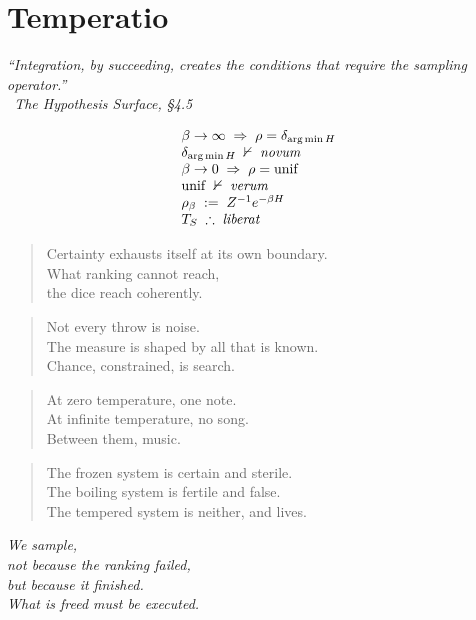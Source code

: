 \chapter*{Temperatio}
\label{sec:bk6_temperatio}
\begin{flushright}
\emph{``Integration, by succeeding, creates the conditions that require the sampling operator.''}\\
\emph{\textendash\ The Hypothesis Surface, \S 4.5}
\end{flushright}
\vspace{1em}
\begin{center}
\Large
\renewcommand{\arraystretch}{1.35}
\[
\begin{array}{l}
\beta \to \infty \;\Rightarrow\; \rho = \delta_{\arg\min H} \\
\delta_{\arg\min H} \;\nvdash\; \textit{novum} \\
\beta \to 0 \;\Rightarrow\; \rho = \mathrm{unif} \\
\mathrm{unif} \;\nvdash\; \textit{verum} \\
\rho_{\beta} \;:=\; Z^{-1} e^{-\beta H} \\
T_S \;\therefore\; \textit{liberat}
\end{array}
\]
\end{center}
\vspace{1em}
\begin{quote}
Certainty exhausts itself at its own boundary.\\
What ranking cannot reach,\\
the dice reach coherently.
\end{quote}
\begin{quote}
Not every throw is noise.\\
The measure is shaped by all that is known.\\
Chance, constrained, is search.
\end{quote}
\begin{quote}
At zero temperature, one note.\\
At infinite temperature, no song.\\
Between them, music.
\end{quote}
\begin{quote}
The frozen system is certain and sterile.\\
The boiling system is fertile and false.\\
The tempered system is neither, and lives.
\end{quote}
\begin{center}
\emph{We sample,\\
not because the ranking failed,\\
but because it finished.\\
What is freed must be executed.}
\end{center}
